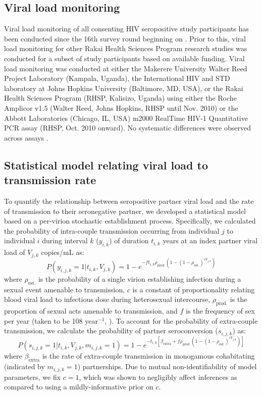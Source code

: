 \documentclass{article}[11pt]
\newcommand{\var}[1]{\DTLfetch{\mydata}{var}{#1}{val}}
\begin{document}
\subsection*{Viral load monitoring}
Viral load monitoring of all consenting HIV seropositive study participants has been conducted since the 16th survey round beginning on \var{r16_minDate}. Prior to this,  viral load monitoring for other Rakai Health Sciences Program research studies was conducted for a subset of study participants based on available funding. Viral load monitoring was conducted at either the Makerere University Walter Reed Project Laboratory (Kampala, Uganda), the International HIV and STD laboratory at
Johns Hopkins University (Baltimore, MD, USA), or the Rakai Health Sciences Program (RHSP, Kalisizo, Uganda) using either the Roche  Amplicor v1.5 (Walter Reed, Johns Hopkins, RHSP until Nov. 2010) or the Abbott Laboratories (Chicago, IL, USA) m2000 RealTime HIV-1 Quantitative PCR assay (RHSP, Oct. 2010 onward). No systematic differences were observed across assays \cite{blanquart2016}. 

\subsection*{Statistical model relating viral load to transmission rate}
To quantify the relationship between seropositive partner viral load and the rate of transmission to their seronegative partner, we developed a statistical model based on a per-virion stochastic establishment process. Specifically, we calculated the probability of intra-couple transmission occurring from individual $j$ to individual $i$ during interval $k$ ($y_{i,k}$) of duration $t_{i,k}$ years at an index partner viral load of $V_{j,k}$ copies/mL as:
\begin{equation}
P(y_{i,j,k}=1|t_{i,k},V_{j,k}) = 1-e^{- f t_{i,k} \rho_{\text{prod.}} \left(1-\left(1-\rho_{\text{est.}}\right)^{c V_{j,k}}\right) }
\end{equation}
where $\rho_{\text{est.}}$ is the probability of a single virion establishing infection during a sexual event amenable to transmission, $c$ is a constant of proportionality relating blood viral load to infectious dose during heterosexual intercourse, $\rho_{\text{prod.}}$ is the proportion of sexual acts amenable to transmission, and $f$ is the frequency of sex per year (taken to be 108 year$^{-1}$, \cite{gray2001}). To account for the probability of extra-couple transmission, we calculate the probability of partner seroconversion ($s_{i,j,k}$) as:
\begin{equation}
P(s_{i,j,k}=1|t_{i,k},V_{j,k}, m_{i,j,k}=1) = 1-e^{-t_{i,k}\left[\beta_\text{extra} + f \rho_{\text{prod.}} \left(1-\left(1-\rho_{\text{est.}}\right)^{c V_{j,k}}\right) \right]}
\end{equation}
where $\beta_\text{extra}$ is the rate of extra-couple transmission in monogamous cohabitating (indicated by $m_{i,j,k}=1$) partnerships. Due to mutual non-identifiability of model parameters, we fix $c=1$, which was shown to negligibly affect inferences as compared to using a mildly-informative prior on $c$. 
\end{document}
